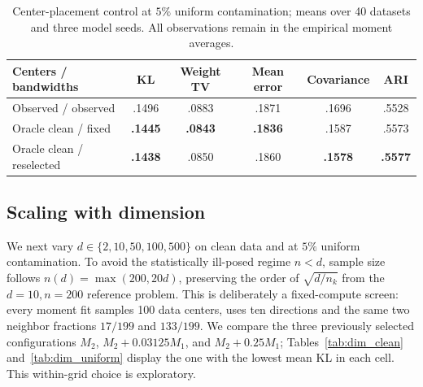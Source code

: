 \documentclass[11pt,a4paper]{article}
\newcommand{\best}[1]{\textbf{#1}}
\newcommand{\Mone}{M_1}
\newcommand{\Mtwo}{M_2}
\begin{document}
\begin{table}[ht]
\centering
\small
\caption{Center-placement control at $5\%$ uniform contamination; means over
40 datasets and three model seeds.  All observations remain in the empirical
moment averages.}
\label{tab:center_control}
\begin{tabular}{@{}l c c c c c@{}}
\toprule
Centers / bandwidths & KL & Weight TV & Mean error & Covariance & ARI \\
\midrule
Observed / observed & .1496 & .0883 & .1871 & .1696 & .5528 \\
Oracle clean / fixed & \best{.1445} & \best{.0843} & \best{.1836} & .1587 & .5573 \\
Oracle clean / reselected & \best{.1438} & .0850 & .1860 & \best{.1578} & \best{.5577} \\
\bottomrule
\end{tabular}
\end{table}

\subsection{Scaling with dimension}
\label{sec:dimension_scaling}

We next vary $d\in\{2,10,50,100,500\}$ on clean data and at $5\%$ uniform
contamination.  To avoid the statistically ill-posed regime $n<d$, sample
size follows $n(d)=\max(200,20d)$, preserving the order of
$\sqrt{d/n_k}$ from the $d=10,n=200$ reference problem.  This is deliberately
a fixed-compute screen: every moment fit samples 100 data centers, uses ten
directions and the same two neighbor fractions $17/199$ and $133/199$.
We compare the three previously selected configurations $\Mtwo$,
$\Mtwo+0.03125\Mone$, and $\Mtwo+0.25\Mone$; Tables~\ref{tab:dim_clean}
and~\ref{tab:dim_uniform} display the one with the lowest mean KL in each
cell.  This within-grid choice is exploratory.
\end{document}
